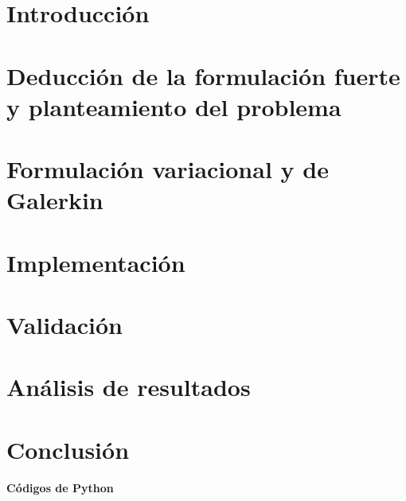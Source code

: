 \documentclass[10pt]{article}
\theoremstyle{definition}
\theoremstyle{remark}
\theoremstyle{definition}
\begin{document}
  \section{Introducci\'on}
    
  \section{Deducci\'on de la formulaci\'on fuerte y planteamiento del problema}
    
  \section{Formulaci\'on variacional y de Galerkin}
    
  \section{Implementaci\'on}
    
  \section{Validaci\'on}
    
  \section{An\'alisis de resultados}
    
  \section{Conclusi\'on}
    
  
  
  \pagebreak

  \twocolumn
  \begin{center}
	  {\bf C\'odigos de Python}
  \end{center}

  
%   
%   
%   
%   
%   
  
%   
  
\end{document}
